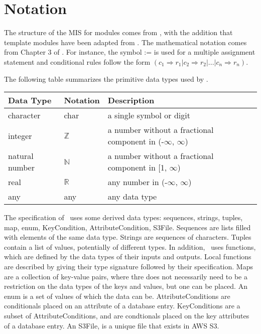 \documentclass[12pt, titlepage]{article}
\begin{document}
\section{Notation}


The structure of the MIS for modules comes from \citet{HoffmanAndStrooper1995},
with the addition that template modules have been adapted from
\cite{GhezziEtAl2003}.  The mathematical notation comes from Chapter 3 of
\citet{HoffmanAndStrooper1995}.  For instance, the symbol := is used for a
multiple assignment statement and conditional rules follow the form $(c_1
\Rightarrow r_1 | c_2 \Rightarrow r_2 | ... | c_n \Rightarrow r_n )$.

The following table summarizes the primitive data types used by \progname.

\begin{center}
  \renewcommand{\arraystretch}{1.2}
  \noindent
  \begin{tabular}{l l p{7.5cm}}
    \toprule
    \textbf{Data Type} & \textbf{Notation} & \textbf{Description}\\
    \midrule
    character & char & a single symbol or digit\\
    integer & $\mathbb{Z}$ & a number without a fractional component
    in (-$\infty$, $\infty$) \\
    natural number & $\mathbb{N}$ & a number without a fractional
    component in [1, $\infty$) \\
    real & $\mathbb{R}$ & any number in (-$\infty$, $\infty$)\\
    any & any & any data type\\
    \bottomrule
  \end{tabular}
\end{center}

\noindent
The specification of \progname \ uses some derived data types:
sequences, strings, tuples, map, enum, KeyCondition,
AttributeCondition, S3File. Sequences
are lists filled with elements of the same data type. Strings
are sequences of characters. Tuples contain a list of values, potentially of
different types. In addition, \progname \ uses functions, which
are defined by the data types of their inputs and outputs. Local functions are
described by giving their type signature followed by their specification. Maps
are a collection of key-value pairs, where thre does not necessarily need to
be a restriction on the data types of the keys and values, but one can be
placed. An enum is a set of values of which the data can be.
AttributeConditions are conditionals placed on an attribute of a
database entry. KeyConditions are a subset of AttributeConditions,
and are condtionals placed on the key attributes of a database entry.
An S3File, is a unique file that exists in AWS S3.
\end{document}
